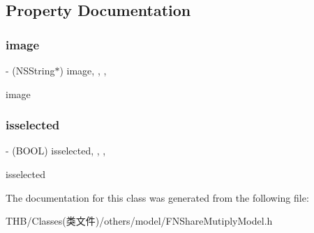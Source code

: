 \subsection{Property Documentation}
\mbox{\label{interface_s_m_m_image_a3b5e61680fe0629a7ca80d891d4f49d5}} 
\subsubsection{\texorpdfstring{image}{image}}
{\footnotesize\ttfamily -\/ (N\+S\+String$\ast$) image\hspace{0.3cm}{\ttfamily [read]}, {\ttfamily [write]}, {\ttfamily [nonatomic]}, {\ttfamily [copy]}}

image \mbox{\label{interface_s_m_m_image_a8e644dbe620fcb70c01a9b31ea86fddc}} 
\subsubsection{\texorpdfstring{isselected}{isselected}}
{\footnotesize\ttfamily -\/ (B\+O\+OL) isselected\hspace{0.3cm}{\ttfamily [read]}, {\ttfamily [write]}, {\ttfamily [nonatomic]}, {\ttfamily [assign]}}

isselected 

The documentation for this class was generated from the following file\+:\begin{DoxyCompactItemize}
\item 
T\+H\+B/\+Classes(类文件)/others/model/F\+N\+Share\+Mutiply\+Model.\+h\end{DoxyCompactItemize}
